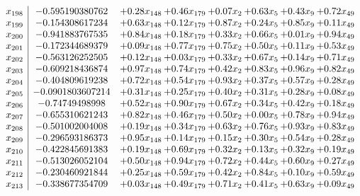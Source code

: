 \documentclass[8pt]{article}
\begin{document}
\[\begin{array}{c| c c@{\hskip 2pt} c@{\hskip 2pt} c@{\hskip 2pt} c@{\hskip 2pt} c@{\hskip 2pt} c@{\hskip 2pt} }
 x_{198}   &  -0.595190380762 & +  0.28 x_{148} & +  0.46 x_{179} & +  0.07 x_{2} & +  0.63 x_{5} & +  0.43 x_{9} & +  0.72 x_{49}\\
 x_{199}   &  -0.154308617234 & +  0.63 x_{148} & +  0.12 x_{179} & +  0.87 x_{2} & +  0.24 x_{5} & +  0.85 x_{9} & +  0.11 x_{49}\\
 x_{200}   &  -0.941883767535 & +  0.84 x_{148} & +  0.18 x_{179} & +  0.33 x_{2} & +  0.66 x_{5} & +  0.01 x_{9} & +  0.94 x_{49}\\
 x_{201}   &  -0.172344689379 & +  0.09 x_{148} & +  0.77 x_{179} & +  0.75 x_{2} & +  0.50 x_{5} & +  0.11 x_{9} & +  0.53 x_{49}\\
 x_{202}   &  -0.563126252505 & +  0.12 x_{148} & +  0.03 x_{179} & +  0.33 x_{2} & +  0.67 x_{5} & +  0.14 x_{9} & +  0.71 x_{49}\\
 x_{203}   &  -0.609218436874 & +  0.97 x_{148} & +  0.74 x_{179} & +  0.42 x_{2} & +  0.83 x_{5} & +  0.96 x_{9} & +  0.82 x_{49}\\
 x_{204}   &  -0.404809619238 & +  0.72 x_{148} & +  0.54 x_{179} & +  0.93 x_{2} & +  0.37 x_{5} & +  0.57 x_{9} & +  0.28 x_{49}\\
 x_{205}   &  -0.0901803607214 & +  0.31 x_{148} & +  0.25 x_{179} & +  0.40 x_{2} & +  0.31 x_{5} & +  0.28 x_{9} & +  0.08 x_{49}\\
 x_{206}   &  -0.74749498998 & +  0.52 x_{148} & +  0.90 x_{179} & +  0.67 x_{2} & +  0.34 x_{5} & +  0.42 x_{9} & +  0.18 x_{49}\\
 x_{207}   &  -0.655310621243 & +  0.82 x_{148} & +  0.46 x_{179} & +  0.50 x_{2} & +  0.00 x_{5} & +  0.78 x_{9} & +  0.94 x_{49}\\
 x_{208}   &  -0.501002004008 & +  0.19 x_{148} & +  0.34 x_{179} & +  0.63 x_{2} & +  0.76 x_{5} & +  0.93 x_{9} & +  0.83 x_{49}\\
 x_{209}   &  -0.296593186373 & +  0.95 x_{148} & +  0.14 x_{179} & +  0.15 x_{2} & +  0.30 x_{5} & +  0.54 x_{9} & +  0.28 x_{49}\\
 x_{210}   &  -0.422845691383 & +  0.19 x_{148} & +  0.69 x_{179} & +  0.32 x_{2} & +  0.13 x_{5} & +  0.32 x_{9} & +  0.19 x_{49}\\
 x_{211}   &  -0.513026052104 & +  0.50 x_{148} & +  0.94 x_{179} & +  0.72 x_{2} & +  0.44 x_{5} & +  0.60 x_{9} & +  0.27 x_{49}\\
 x_{212}   &  -0.230460921844 & +  0.25 x_{148} & +  0.59 x_{179} & +  0.42 x_{2} & +  0.84 x_{5} & +  0.10 x_{9} & +  0.59 x_{49}\\
 x_{213}   &  -0.338677354709 & +  0.03 x_{148} & +  0.49 x_{179} & +  0.71 x_{2} & +  0.41 x_{5} & +  0.63 x_{9} & +  0.09 x_{49}\\

\end{array}\]
\end{document}
